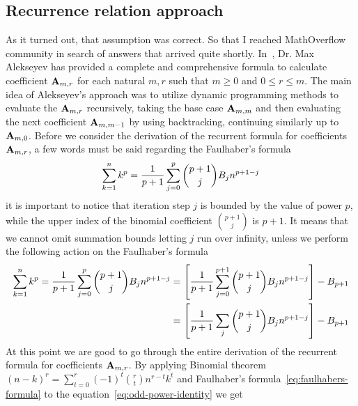 \subsection{Recurrence relation approach}\label{subsec:recurrence-relation-approach}
As it turned out, that assumption was correct.
So that I reached MathOverflow community in search of answers that arrived quite shortly.
In~\cite{alekseyev2018mathoverflow}, Dr. Max Alekseyev has provided a complete and comprehensive formula to calculate
coefficient ${\mathbf{A}} \sb{m,r}$ for each natural $m,r$ such that $m\geq 0$ and $0 \leq r \leq m$.
The main idea of Alekseyev's approach was to utilize dynamic programming methods to evaluate the ${\mathbf{A}} \sb{m,r}$ recursively,
taking the base case ${\mathbf{A}} \sb{m,m}$ and then evaluating the next coefficient ${\mathbf{A}} \sb{m,m-1}$
by using backtracking, continuing similarly up to ${\mathbf{A}} \sb{m,0}$.
Before we consider the derivation of the recurrent formula for coefficients ${\mathbf{A}} \sb{m,r}$,
a few words must be said regarding the Faulhaber's formula~\cite{beardon1996sums}
\begin{equation*}
    \sum_{k=1}^{n} k^{p} = \frac{1}{p+1}\sum_{j=0}^{p} \binom{p+1}{j} {B}\sb{j} n^{p+1-j}
\end{equation*}
it is important to notice that iteration step $j$ is bounded by the value of power $p$,
while the upper index of the binomial coefficient $\binom{p+1}{j}$ is $p+1$.
It means that we cannot omit summation bounds letting $j$ run over infinity,
unless we perform the following action on the Faulhaber's formula
\begin{equation}
    \begin{split}
        \sum_{k=1}^{n} k^{p}
        = \frac{1}{p+1}\sum_{j=0}^{p} \binom{p+1}{j} {B}\sb{j} n^{p+1-j}
        &= \left[ \frac{1}{p+1}\sum_{j=0}^{p+1} \binom{p+1}{j} {B}\sb{j} n^{p+1-j} \right] - {B}\sb{p+1} \\
        &= \left[ \frac{1}{p+1}\sum_{j} \binom{p+1}{j} {B}\sb{j} n^{p+1-j} \right] - {B}\sb{p+1}
    \end{split}\label{eq:faulhabers-formula}
\end{equation}
At this point we are good to go through the entire derivation of the recurrent formula for
coefficients ${\mathbf{A}} \sb{m,r}$.
By applying Binomial theorem $(n-k)^r=\sum_{t=0}^{r} (-1)^t \binom{r}{t} n^{r-t} k^t$ and Faulhaber's formula~\eqref{eq:faulhabers-formula}
to the equation~\eqref{eq:odd-power-identity} we get
